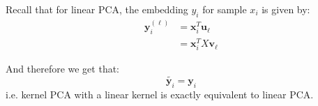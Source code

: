 \documentclass{article}
\begin{document}
Recall that for linear PCA, the embedding $y_i$ for sample $x_i$ is given by:
\begin{align*}
  \bm{y}_i^{(\ell)} &= \bm{x}_i ^{T} \bm{u}_{\ell}  \\
  &= \bm{x}_i ^{T} X \bm{v}_\ell
\end{align*}

And therefore we get that:
\[
  \widetilde{\bm{y}_i} = \bm{y}_i
\]
i.e. kernel PCA with a linear kernel is exactly equivalent to linear PCA. 
\end{document}
